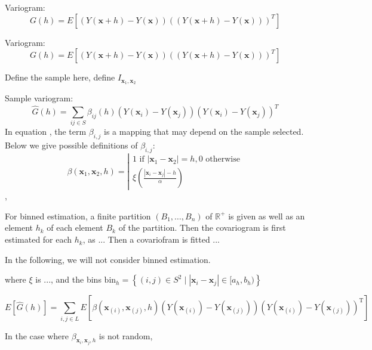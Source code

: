 \documentclass[12pt]{article}
\theoremstyle{definition}
\theoremstyle{remark}
\newcommand{\paramnuisance}{\xi}
\newcommand{\Sample}{S}
\newcommand{\position}{\mathbf{x}}
\newcommand{\Sampleindex}{L}
\newcommand{\Signal}{Y}
\begin{document}
Variogram:
\begin{equation}
    G(h)=E[(\Signal(\position+h)-\Signal(\position))((\Signal(\position+h)-\Signal(\position)))^{T}]
\end{equation}


Variogram:
\begin{equation}
    G(h)=E[(Y(\mathbf{x}+h)-Y(\mathbf{x}))((Y(\mathbf{x}+h)-Y(\mathbf{x})))^{T}]
\end{equation}

{\color{red}Define the sample here, define $I_{\position_1,\position_2}$}

Sample variogram:
\begin{equation} \label{somelabel}
    \hat{G}(h)=\sum_{ij\in\Sample}{\beta_{ij}(h)(Y(\mathbf{x}_{i})-Y(\mathbf{x}_{j}))(Y(\mathbf{x}_{i})-Y(\mathbf{x}_{j}))^{T}}
\end{equation}
In equation , the term $\beta_{i,j}$ is a mapping that may depend on the sample selected.
Below we give possible definitions of $\beta_{i,j}$:
\begin{equation}
    \beta(\position_1,\position_2,h)=
    \left|\begin{array}{l}
    1 \text{ if } |\mathbf{x}_1-\mathbf{x}_2|=h, 0 \text{ otherwise}\\
    \paramnuisance(\frac{|\mathbf{x}_{i}-\mathbf{x}_{j}|-h}{\alpha})
    \end{array}\right.
\end{equation},

For binned estimation, a finite partition $(B_1,\ldots,B_n)$ of $\mathbb{R}^+$ is given as well as an element $h_k$ of each element $B_k$ of the partition. 
Then the covariogram is first estimated for each $h_k$, as 
...
Then a covariofram is fitted 
...

In the following, we will not consider binned estimation.


where {\color{red} $\paramnuisance$ is ..., and the bins $\mathrm{bin}_h=\left\{(i,j)\in\Sample^2\mid \left|\position_i-\position_j\right|\in [a_h,b_h)\right\}$}

\begin{equation}
    E[\hat{G}(h)]=\sum_{i,j\in\Sampleindex}E\left[ \beta(\position_{(i)},\position_{(j)},h)(Y(\mathbf{x}_{(i)})-Y(\mathbf{x}_{(j)}))(Y(\mathbf{x}_{(i)})-Y(\mathbf{x}_{(j)}))^{\mathrm{T}}\right]
\end{equation}


In the case where $\beta_{\position_i,\position_j,h}$ is not random,
\end{document}
